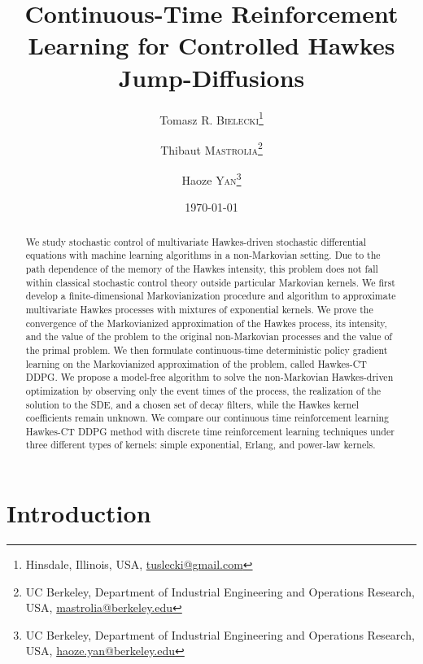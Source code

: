 \documentclass[11pt]{article}
\title{Continuous-Time Reinforcement Learning for Controlled Hawkes Jump-Diffusions}
\author{Tomasz R. \textsc{Bielecki}\footnote{Hinsdale, Illinois, USA, \url{tuslecki@gmail.com}}\and Thibaut \textsc{Mastrolia}\footnote{UC Berkeley, Department of Industrial Engineering and Operations Research, USA, \url{mastrolia@berkeley.edu}}\and Haoze \textsc{Yan}\footnote{UC Berkeley, Department of Industrial Engineering and Operations Research, USA, \url{haoze.yan@berkeley.edu}} }
\date{\today}
\theoremstyle{remarkitalic}
\theoremstyle{remarkitalic}
\newcommand{\1}{\mathbf 1}
\begin{document}
\maketitle

\begin{abstract}
We study stochastic control of multivariate Hawkes-driven stochastic differential equations with machine learning algorithms in a non-Markovian setting. Due to the path dependence of the memory of the Hawkes intensity, this problem does not fall within classical stochastic control theory outside particular Markovian kernels. We first develop a finite-dimensional Markovianization procedure and algorithm to approximate multivariate Hawkes processes with mixtures of exponential kernels. We prove the convergence of the Markovianized approximation of the Hawkes process, its intensity, and the value of the problem to the original non-Markovian processes and the value of the primal problem. We then formulate continuous-time deterministic policy gradient learning on the Markovianized approximation of the problem, called Hawkes-CT DDPG. We propose a model-free algorithm to solve the non-Markovian Hawkes-driven optimization by observing only the event times of the process, the realization of the solution to the SDE, and a chosen set of decay filters, while the Hawkes kernel coefficients remain unknown. We compare our continuous time reinforcement learning Hawkes-CT DDPG method with discrete time reinforcement learning techniques under three different types of kernels: simple exponential, Erlang, and power-law kernels.
\end{abstract}

\section{Introduction}
\end{document}
